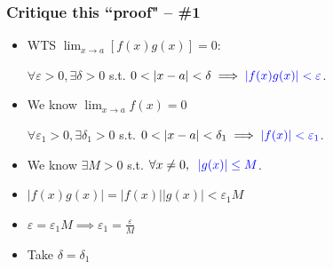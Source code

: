 \documentclass[14pt]{beamer}
\begin{document}
	\begin{frame}[t]
		\frametitle{Critique this ``proof" -- \#1}
		\fontsize{13}{13}\selectfont
		\begin{itemize}
			\item WTS $\displaystyle \lim_{x \to a}\left[ f(x) g(x) \right] = 0$:

				\hfill $\displaystyle \forall \varepsilon>0, \exists \delta>0$ \; s.t.
				\;
				$\displaystyle 0<|x-a|<\delta \implies{\color{blue} |f(x) g(x)| < \varepsilon}$.
				\vfill

			\item We know $\displaystyle \lim_{x \to a}f(x) = 0$

				\hfill $\displaystyle \forall \varepsilon_{1}>0, \exists \delta_{1}>0$
				\; s.t. \; $\displaystyle 0<|x-a|<\delta_{1}\implies{\color{blue} |f(x)| <\varepsilon_1}$.
				\vfill

			\item We know \hfill $\displaystyle \exists M>0$ \; s.t. \;
				$\displaystyle \forall x \neq 0, \; \;{\color{blue} |g(x)| \leq M}$.
				\vfill

			\item $\displaystyle |f(x)g(x)| = |f(x)||g(x)| < \varepsilon_{1}M$
				\vfill

			\item $\displaystyle \varepsilon = \varepsilon_{1}M \implies \varepsilon_{1}
				= \frac{\varepsilon}{M}$
				\vfill

			\item Take $\displaystyle \delta = \delta_{1}$
				\vfill
		\end{itemize}
	\end{frame}

\end{document}
